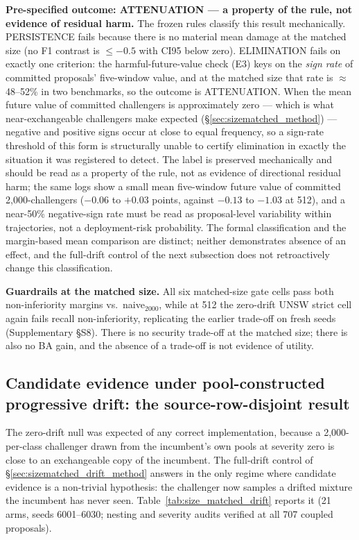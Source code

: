 \documentclass[journal]{IEEEtran}
\begin{document}


\textbf{Pre-specified outcome: ATTENUATION --- a property of the rule, not evidence of residual harm.} The frozen rules classify this result mechanically. PERSISTENCE fails because there is no material mean damage at the matched size (no F1 contrast is $\le -0.5$ with CI95 below zero). ELIMINATION fails on exactly one criterion: the harmful-future-value check (E3) keys on the \emph{sign rate} of committed proposals' five-window value, and at the matched size that rate is $\approx$48--52\% in two benchmarks, so the outcome is ATTENUATION. When the mean future value of committed challengers is approximately zero --- which is what near-exchangeable challengers make expected (\S\ref{sec:sizematched_method}) --- negative and positive signs occur at close to equal frequency, so a sign-rate threshold of this form is structurally unable to certify elimination in exactly the situation it was registered to detect. The label is preserved mechanically and should be read as a property of the rule, not as evidence of directional residual harm; the same logs show a small mean five-window future value of committed 2{,}000-challengers ($-0.06$ to $+0.03$ points, against $-0.13$ to $-1.03$ at 512), and a near-50\% negative-sign rate must be read as proposal-level variability within trajectories, not a deployment-risk probability. The formal classification and the margin-based mean comparison are distinct; neither demonstrates absence of an effect, and the full-drift control of the next subsection does not retroactively change this classification.

\textbf{Guardrails at the matched size.} All six matched-size gate cells pass both non-inferiority margins vs.\ naive$_{2000}$, while at 512 the zero-drift UNSW strict cell again fails recall non-inferiority, replicating the earlier trade-off on fresh seeds (Supplementary \S S8). There is no security trade-off at the matched size; there is also no BA gain, and the absence of a trade-off is not evidence of utility.

\subsection{Candidate evidence under pool-constructed progressive drift: the source-row-disjoint result}
\label{sec:sizematched_drift}

The zero-drift null was expected of any correct implementation, because a 2{,}000-per-class challenger drawn from the incumbent's own pools at severity zero is close to an exchangeable copy of the incumbent. The full-drift control of \S\ref{sec:sizematched_drift_method} answers in the only regime where candidate evidence is a non-trivial hypothesis: the challenger now samples a drifted mixture the incumbent has never seen. Table~\ref{tab:size_matched_drift} reports it (21 arms, seeds 6001--6030; nesting and severity audits verified at all 707 coupled proposals).
\end{document}
